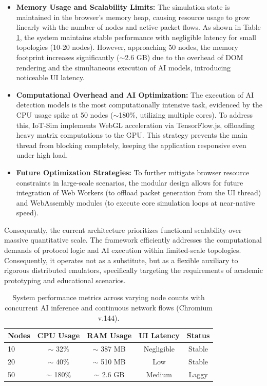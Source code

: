 \begin{itemize}
    \item \textbf{Memory Usage and Scalability Limits:} The simulation state is maintained in the browser's memory heap, causing resource usage to grow linearly with the number of nodes and active packet flows. As shown in Table \ref{tab:performance}, the system maintains stable performance with negligible latency for small topologies (10-20 nodes). However, approaching 50 nodes, the memory footprint increases significantly ($\sim$2.6 GB) due to the overhead of DOM rendering and the simultaneous execution of AI models, introducing noticeable UI latency.

    \item \textbf{Computational Overhead and AI Optimization:} The execution of AI detection models is the most computationally intensive task, evidenced by the CPU usage spike at 50 nodes ($\sim$180\%, utilizing multiple cores). To address this, IoT-Sim implements WebGL acceleration via TensorFlow.js, offloading heavy matrix computations to the GPU. This strategy prevents the main thread from blocking completely, keeping the application responsive even under high load.

    \item \textbf{Future Optimization Strategies:} To further mitigate browser resource constraints in large-scale scenarios, the modular design allows for future integration of Web Workers (to offload packet generation from the UI thread) and WebAssembly modules (to execute core simulation loops at near-native speed).
\end{itemize}

Consequently, the current architecture prioritizes functional scalability over massive quantitative scale. The framework efficiently addresses the computational demands of protocol logic and AI execution within limited-scale topologies. Consequently, it operates not as a substitute, but as a flexible auxiliary to rigorous distributed emulators, specifically targeting the requirements of academic prototyping and educational scenarios.

\begin{table}[h]
    \centering
    \caption{System performance metrics across varying node counts with concurrent AI inference and continuous network flows (Chromium v.144).}
    \label{tab:performance}
    \small
    \begin{tabular}{lcccc}
        \hline
        \textbf{Nodes} & \textbf{CPU Usage} & \textbf{RAM Usage} & \textbf{UI Latency} & \textbf{Status} \\ \hline
        10 & $\sim$ 32\% & $\sim$ 387 MB & Negligible & Stable \\
        20 & $\sim$ 40\% & $\sim$ 510 MB & Low & Stable \\
        50 & $\sim$ 180\% & $\sim$ 2.6 GB & Medium & Laggy \\ \hline
    \end{tabular}
\end{table}
